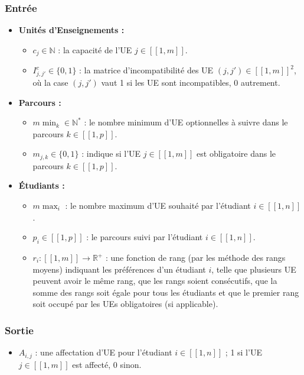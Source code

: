 \documentclass{rapport}
\theoremstyle{definition}
\theoremstyle{remark}
\theoremstyle{plain}
\theoremstyle{definition}
\theoremstyle{remark}
\newcommand{\llbracket}{[\![}
\newcommand{\rrbracket}{]\!]}
\begin{document}
\subsubsection{Entrée}
\begin{itemize}
    \item \textbf{Unités d'Enseignements :}
    \begin{itemize}
        \item $c_j \in \mathbb{N}$ : la capacité de l'UE $j \in \llbracket 1,m \rrbracket$.
        \item $I^c_{j,j'} \in \{0,1\}$ : la matrice d'incompatibilité des UE $(j,j') \in \llbracket 1,m \rrbracket^2$, où la case $(j,j')$ vaut 1 si les UE sont incompatibles, 0 autrement.
    \end{itemize}

    \item \textbf{Parcours :}
    \begin{itemize}
        \item $m\!\min_k \in \mathbb{N}^*$ : le nombre minimum d'UE optionnelles à suivre dans le parcours $k \in \llbracket 1,p \rrbracket$.
        \item $m_{j,k} \in \{0,1\}$ : indique si l'UE $j \in \llbracket 1,m \rrbracket$ est obligatoire dans le parcours $k \in \llbracket 1,p \rrbracket$.
    \end{itemize}

    \item \textbf{Étudiants :}
    \begin{itemize}
        \item $m\!\max_i$ : le nombre maximum d'UE souhaité par l'étudiant $i \in \llbracket 1,n \rrbracket$.
        \item $p_i \in \llbracket 1,p \rrbracket$ : le parcours suivi par l'étudiant $i \in \llbracket 1,n \rrbracket$.
        \item $r_i : \llbracket 1,m \rrbracket \to \mathbb{R}^{+}$ : une fonction de rang (par les méthode des rangs moyens) indiquant les préférences d'un étudiant $i$, telle que plusieurs UE peuvent avoir le même rang, que les rangs soient consécutifs, que la somme des rangs soit égale pour tous les étudiants et que le premier rang soit occupé par les UEs obligatoires (si applicable).
    \end{itemize}
\end{itemize}

\subsubsection{Sortie}
\begin{itemize}
    \item $A_{i,j}$ : une affectation d'UE pour l'étudiant $i \in \llbracket 1,n \rrbracket$ ; 1 si l'UE $j \in \llbracket 1,m \rrbracket$ est affecté, 0 sinon.
\end{itemize}
\end{document}
